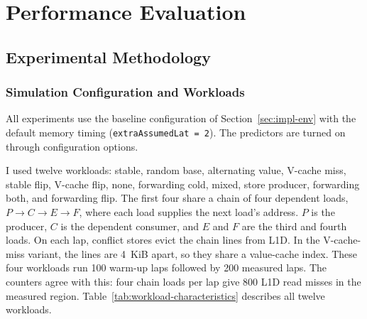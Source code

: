 \section{Performance Evaluation}
\label{sec:performance-evaluation}


\subsection{Experimental Methodology}
\label{subsec:performance-methodology}

\subsubsection{Simulation Configuration and Workloads}

All experiments use the baseline configuration of
Section~\ref{sec:impl-env} with the default memory timing
(\texttt{extraAssumedLat = 2}). The predictors are turned on through
configuration options.

I used twelve workloads: stable, random base, alternating value,
V-cache miss, stable flip, V-cache flip, none, forwarding cold, mixed,
store producer, forwarding both, and forwarding flip. The first four
share a chain of four dependent loads,
$P\rightarrow C\rightarrow E\rightarrow F$, where each load supplies
the next load's address. $P$ is the producer, $C$ is the dependent
consumer, and $E$ and $F$ are the third and fourth loads. On each lap,
conflict stores evict the chain lines from L1D. In the V-cache-miss
variant, the lines are 4~KiB apart, so they share a value-cache index.
These four workloads run 100 warm-up laps followed by 200 measured
laps. The counters agree with this: four chain loads per lap give 800
L1D read misses in the measured region.
Table~\ref{tab:workload-characteristics} describes all twelve
workloads.

